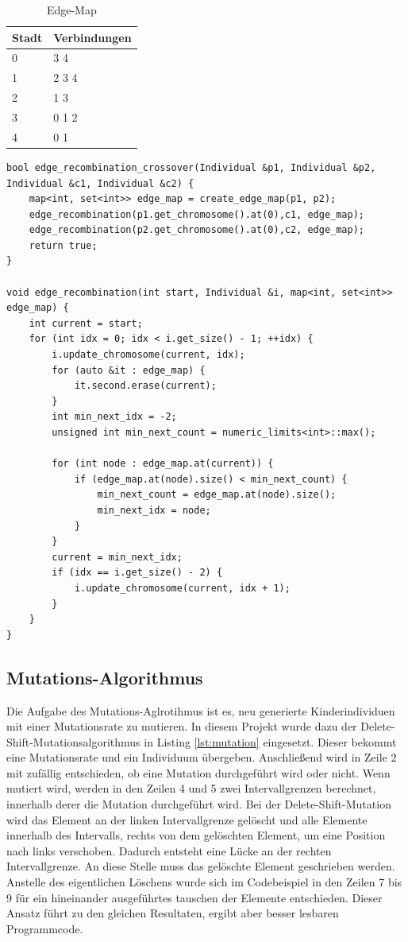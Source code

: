 \begin{table}[H]
\center
\caption{Edge-Map}
\begin{tabular}{l|l}
Stadt & Verbindungen \\
\hline
0 & 3 4\\
1 & 2 3 4\\
2 & 1 3\\
3 & 0 1 2\\
4 & 0 1\\
\end{tabular}
\label{tab:em}
\end{table}

\begin{minipage}{\linewidth}
\begin{lstlisting}[caption={Edge-Recombination-Crossover}, firstnumber=1, captionpos=b, label=lst:erx]
bool edge_recombination_crossover(Individual &p1, Individual &p2, Individual &c1, Individual &c2) {
	map<int, set<int>> edge_map = create_edge_map(p1, p2);
	edge_recombination(p1.get_chromosome().at(0),c1, edge_map);
	edge_recombination(p2.get_chromosome().at(0),c2, edge_map);
	return true;
}

void edge_recombination(int start, Individual &i, map<int, set<int>> edge_map) {
	int current = start;
	for (int idx = 0; idx < i.get_size() - 1; ++idx) {
		i.update_chromosome(current, idx);
		for (auto &it : edge_map) {
			it.second.erase(current);
		}
		int min_next_idx = -2;
		unsigned int min_next_count = numeric_limits<int>::max();

		for (int node : edge_map.at(current)) {
			if (edge_map.at(node).size() < min_next_count) {
				min_next_count = edge_map.at(node).size();
				min_next_idx = node;
			}
		}
		current = min_next_idx;
		if (idx == i.get_size() - 2) {
			i.update_chromosome(current, idx + 1);
		}
	}
}
\end{lstlisting}
\end{minipage}

\subsection{Mutations-Algorithmus}
Die Aufgabe des Mutations-Aglrotihmus ist es, neu generierte Kinderindividuen mit einer Mutationsrate zu mutieren.
In diesem Projekt wurde dazu der Delete-Shift-Mutationsalgorithmus in Listing \ref{lst:mutation} eingesetzt. Dieser bekommt eine Mutationsrate und ein Individuum übergeben.
Anschließend wird in Zeile 2 mit zufällig entschieden, ob eine Mutation durchgeführt wird oder nicht. Wenn mutiert wird, werden in den Zeilen 4 und 5 zwei Intervallgrenzen berechnet, innerhalb derer die Mutation durchgeführt wird.
Bei der Delete-Shift-Mutation wird das Element an der linken Intervallgrenze gelöscht und alle Elemente innerhalb des Intervalls, rechts von dem gelöschten Element, um eine Position nach links verschoben. Dadurch entsteht eine Lücke an der rechten Intervallgrenze. An diese Stelle muss das gelöschte Element geschrieben werden. Anstelle des eigentlichen Löschens wurde sich im Codebeispiel in den Zeilen 7 bis 9 für ein hineinander ausgeführtes tauschen der Elemente entschieden. Dieser Ansatz führt zu den gleichen Resultaten, ergibt aber besser lesbaren Programmcode.

